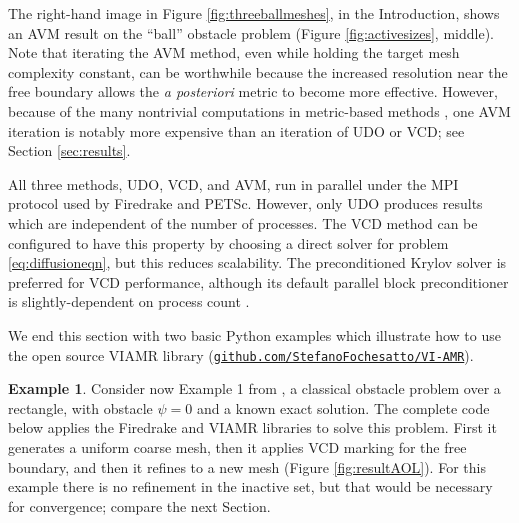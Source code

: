 \documentclass[]{interact}
\theoremstyle{plain}%
\theoremstyle{definition}
\newtheorem{example}[theorem]{Example}
\theoremstyle{remark}
\begin{document}
The right-hand image in Figure \ref{fig:threeballmeshes}, in the Introduction, shows an AVM result on the ``ball'' obstacle problem (Figure \ref{fig:activesizes}, middle).  Note that iterating the AVM method, even while holding the target mesh complexity constant, can be worthwhile because the increased resolution near the free boundary allows the \emph{a posteriori} metric to become more effective.  However, because of the many nontrivial computations in metric-based methods \cite{Alauzet2010,Wallworketal2020}, one AVM iteration is notably more expensive than an iteration of UDO or VCD; see Section \ref{sec:results}.

All three methods, UDO, VCD, and AVM, run in parallel under the MPI protocol used by Firedrake \cite{Langeetal2016} and PETSc.  However, only UDO produces results which are independent of the number of processes.  The VCD method can be configured to have this property by choosing a direct solver for problem \eqref{eq:diffusioneqn}, but this reduces scalability.  The preconditioned Krylov solver is preferred for VCD performance, although its default parallel block preconditioner is slightly-dependent on process count \cite{Bueler2021}.

We end this section with two basic Python examples which illustrate how to use the open source VIAMR library (\href{https://github.com/StefanoFochesatto/VI-AMR}{{\small \texttt{github.com/StefanoFochesatto/VI-AMR}}}).

\begin{example} \label{example:AOL}
Consider now Example 1 from \cite{AinsworthOdenLee1993}, a classical obstacle problem over a rectangle, with obstacle $\psi=0$ and a known exact solution.  The complete code below applies the Firedrake and VIAMR libraries to solve this problem.  First it generates a uniform coarse mesh, then it applies VCD marking for the free boundary, and then it refines to a new mesh (Figure \ref{fig:resultAOL}).  For this example there is no refinement in the inactive set, but that would be necessary for convergence; compare the next Section.
\inputminted[linenos, frame=lines]{python}{../examples/aol.py}
\end{example}
\end{document}
